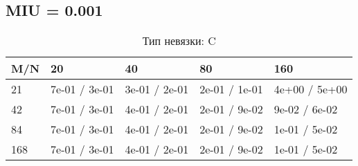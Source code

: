 \documentclass[a4paper,11pt]{article}
\begin{document}
\subsection{MIU = 0.001}
\begin{table}[H]
\caption {Тип невязки: C   }
\begin{center}
\begin{tabular}{l|l|l|l|l}
\hline
M/N  & 20 & 40 & 80 & 160 \\ \hline
  21 & 7e-01 / 3e-01& 3e-01 / 2e-01& 2e-01 / 1e-01& 4e+00 / 5e+00\\ \hline
  42 & 7e-01 / 3e-01& 4e-01 / 2e-01& 2e-01 / 9e-02& 9e-02 / 6e-02\\ \hline
  84 & 7e-01 / 3e-01& 4e-01 / 2e-01& 2e-01 / 9e-02& 1e-01 / 5e-02\\ \hline
 168 & 7e-01 / 3e-01& 4e-01 / 2e-01& 2e-01 / 9e-02& 1e-01 / 5e-02\\ \hline
\end{tabular}
\end{center}
\end{table}
\end{document}
